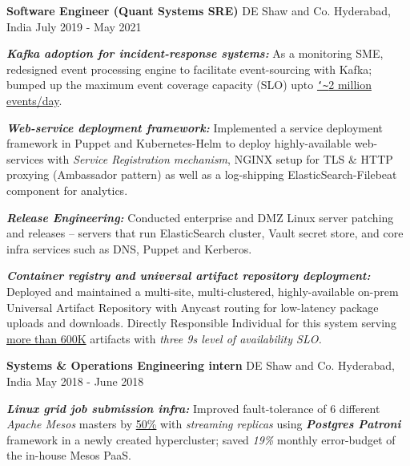 \vspace{-0.2cm}

\begin{cventries}
  \cventry
    {\textbf{Software Engineer (Quant Systems SRE)}} %
    {DE Shaw and Co.} %
    {Hyderabad, India} %
    {July 2019 - May 2021} %
    {
      \begin{cvitems} %
        \item {\textbf{\textit{Kafka adoption for incident-response systems:}} As a monitoring SME, redesigned event processing engine to facilitate event-sourcing with Kafka; bumped up the maximum event coverage capacity (SLO) upto  \underline{\texttt{\char`\~}2 million events/day}.
        }
        \vspace{0.1cm}
        \item {\textbf{\textit{Web-service deployment framework:}} Implemented a service deployment framework in Puppet and Kubernetes-Helm to deploy highly-available web-services with \textit{Service Registration mechanism}, NGINX setup for TLS \& HTTP proxying (Ambassador pattern) as well as a log-shipping ElasticSearch-Filebeat component for analytics.
        }
        \vspace{0.1cm}
        \item {\textbf{\textit{Release Engineering:}} Conducted enterprise and DMZ Linux server patching and releases -- servers that run ElasticSearch cluster,  Vault secret store, and core infra services such as DNS, Puppet and Kerberos.
        }
        \vspace{0.1cm}
        \item {\textbf{\textit{Container registry and universal artifact repository deployment:}} Deployed and maintained a multi-site, multi-clustered, highly-available on-prem Universal Artifact Repository with Anycast routing for low-latency package uploads and downloads. Directly Responsible Individual for this system serving \underline{more than 600K} artifacts with \textit{three 9s level of availability SLO.}
        }
      \end{cvitems}
    }
  \cventry
    {\textbf{Systems \& Operations Engineering intern}} %
    {DE Shaw and Co.} %
    {Hyderabad, India} %
    {May 2018 - June 2018} %
    {
      \begin{cvitems} %
        \item {\textbf{\textit{Linux grid job submission infra:}} Improved fault-tolerance of 6 different \textit{Apache Mesos} masters by \underline{50\%} with \textit{streaming replicas} using \textbf{\emph{Postgres Patroni}} framework in a newly created hypercluster; saved \textit{19\%} monthly error-budget of the in-house Mesos PaaS.
}
\end{cvitems}}
\end{cventries}

